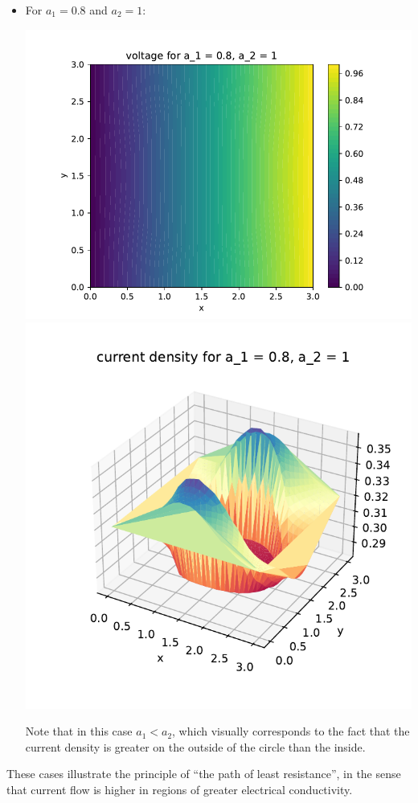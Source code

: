 \documentclass{article}
\begin{document}
\begin{enumerate}
\begin{itemize}
	\item For $a_1=0.8$ and $a_2=1$:
	\begin{center}
		\includegraphics[scale=.4]{hw8 voltage 2}
		\includegraphics[scale=.4]{hw8 current 2}
	\end{center}
	Note that in this case $a_1<a_2$, which visually corresponds to the fact that the current density is greater on the outside of the circle than the inside.
\end{itemize}
These cases illustrate the principle of ``the path of least resistance'', in the sense that current flow is higher in regions of greater electrical conductivity.




\end{enumerate}
\end{document}

